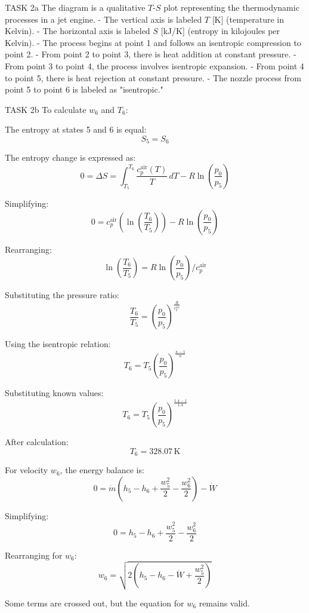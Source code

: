 TASK 2a  
The diagram is a qualitative \( T \)-\( S \) plot representing the thermodynamic processes in a jet engine.  
- The vertical axis is labeled \( T \) [K] (temperature in Kelvin).  
- The horizontal axis is labeled \( S \) [kJ/K] (entropy in kilojoules per Kelvin).  
- The process begins at point 1 and follows an isentropic compression to point 2.  
- From point 2 to point 3, there is heat addition at constant pressure.  
- From point 3 to point 4, the process involves isentropic expansion.  
- From point 4 to point 5, there is heat rejection at constant pressure.  
- The nozzle process from point 5 to point 6 is labeled as "isentropic."  

TASK 2b  
To calculate \( w_6 \) and \( T_6 \):  

The entropy at states 5 and 6 is equal:  
\[
S_5 = S_6
\]

The entropy change is expressed as:  
\[
0 = \Delta S = \int_{T_5}^{T_6} \frac{c_p^{\text{air}}(T)}{T} \, dT - R \ln \left( \frac{p_0}{p_5} \right)
\]

Simplifying:  
\[
0 = c_p^{\text{air}} \left( \ln \left( \frac{T_6}{T_5} \right) \right) - R \ln \left( \frac{p_0}{p_5} \right)
\]

Rearranging:  
\[
\ln \left( \frac{T_6}{T_5} \right) = R \ln \left( \frac{p_0}{p_5} \right) / c_p^{\text{air}}
\]

Substituting the pressure ratio:  
\[
\frac{T_6}{T_5} = \left( \frac{p_0}{p_5} \right)^{\frac{R}{c_p^{\text{air}}}}
\]

Using the isentropic relation:  
\[
T_6 = T_5 \left( \frac{p_0}{p_5} \right)^{\frac{\kappa - 1}{\kappa}}
\]

Substituting known values:  
\[
T_6 = T_5 \left( \frac{p_0}{p_5} \right)^{\frac{1.4 - 1}{1.4}}
\]

After calculation:  
\[
T_6 = 328.07 \, \text{K}
\]

For velocity \( w_6 \), the energy balance is:  
\[
0 = \dot{m} \left( h_5 - h_6 + \frac{w_5^2}{2} - \frac{w_6^2}{2} \right) - \dot{W}
\]

Simplifying:  
\[
0 = h_5 - h_6 + \frac{w_5^2}{2} - \frac{w_6^2}{2}
\]

Rearranging for \( w_6 \):  
\[
w_6 = \sqrt{2 \left( h_5 - h_6 - \dot{W} + \frac{w_5^2}{2} \right)}
\]  

Some terms are crossed out, but the equation for \( w_6 \) remains valid.